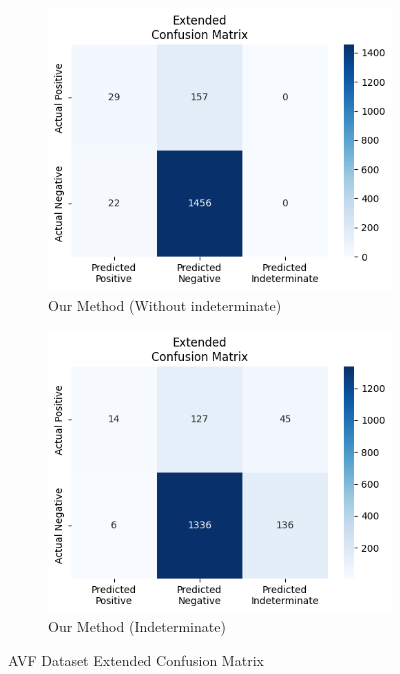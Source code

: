 \begin{figure}[H]
    \begin{subfigure}[b]{0.5\textwidth}
        \centering
        \includegraphics[width=\linewidth]{figures/without_AVF.png}
        \caption{Our Method (Without indeterminate)}
        \label{fig:pta-symptom-method1}
    \end{subfigure}%
    \hfill
    \begin{subfigure}[b]{0.5\textwidth}
        \centering
        \includegraphics[width=\linewidth]{figures/with_AVF.png}
        \caption{Our Method (Indeterminate)}
        \label{fig:pta-symptom-method2}
    \end{subfigure}

    \caption{AVF Dataset Extended Confusion Matrix}
    \label{fig:combined}
\end{figure}


